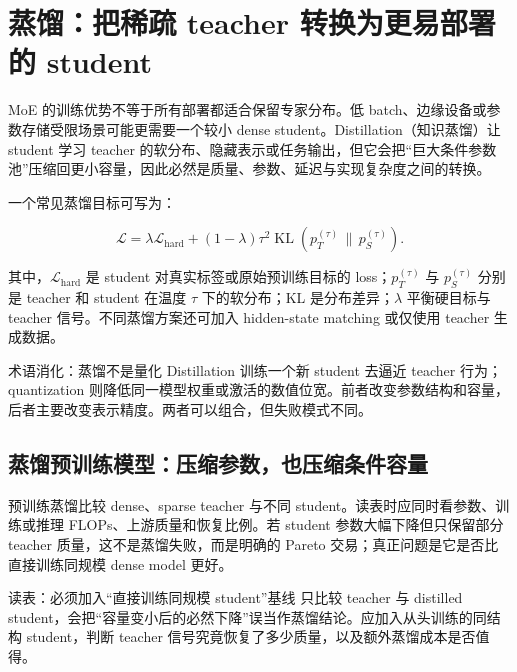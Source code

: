 \section{蒸馏：把稀疏 teacher 转换为更易部署的 student}

MoE 的训练优势不等于所有部署都适合保留专家分布。低 batch、边缘设备或参数存储受限场景可能更需要一个较小 dense student。Distillation（知识蒸馏）让 student 学习 teacher 的软分布、隐藏表示或任务输出，但它会把“巨大条件参数池”压缩回更小容量，因此必然是质量、参数、延迟与实现复杂度之间的转换。


一个常见蒸馏目标可写为：

\[
\mathcal{L}=\lambda\mathcal{L}_{\text{hard}}+(1-\lambda)\tau^2
\operatorname{KL}\!\left(p_T^{(\tau)}\,\|\,p_S^{(\tau)}\right).
\]

其中，$\mathcal{L}_{\text{hard}}$ 是 student 对真实标签或原始预训练目标的 loss；$p_T^{(\tau)}$ 与 $p_S^{(\tau)}$ 分别是 teacher 和 student 在温度 $\tau$ 下的软分布；KL 是分布差异；$\lambda$ 平衡硬目标与 teacher 信号。不同蒸馏方案还可加入 hidden-state matching 或仅使用 teacher 生成数据。

\begin{knowledgebox}{术语消化：蒸馏不是量化}
Distillation 训练一个新 student 去逼近 teacher 行为；quantization 则降低同一模型权重或激活的数值位宽。前者改变参数结构和容量，后者主要改变表示精度。两者可以组合，但失败模式不同。
\end{knowledgebox}

\subsection{蒸馏预训练模型：压缩参数，也压缩条件容量}

预训练蒸馏比较 dense、sparse teacher 与不同 student。读表时应同时看参数、训练或推理 FLOPs、上游质量和恢复比例。若 student 参数大幅下降但只保留部分 teacher 质量，这不是蒸馏失败，而是明确的 Pareto 交易；真正问题是它是否比直接训练同规模 dense model 更好。


\begin{knowledgebox}{读表：必须加入“直接训练同规模 student”基线}
只比较 teacher 与 distilled student，会把“容量变小后的必然下降”误当作蒸馏结论。应加入从头训练的同结构 student，判断 teacher 信号究竟恢复了多少质量，以及额外蒸馏成本是否值得。
\end{knowledgebox}

